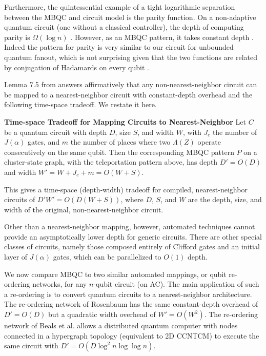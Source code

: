 Furthermore, the quintessential example of a tight logarithmic separation
between the MBQC and circuit model is the parity function.
On a non-adaptive quantum circuit (one without a classical controller),
the depth of computing parity is $\Omega(\log n)$ \cite{Fang2003}.
However, as an MBQC pattern, it takes constant depth \cite{Broadbent2007}.
Indeed the pattern for parity is very similar to our circuit for unbounded
quantum fanout, which is not surprising given that the two functions are
related by conjugation of Hadamards on every qubit \cite{Moore1999}.

Lemma 7.5 from \cite{Broadbent2007} answers affirmatively that any
non-nearest-neighbor circuit can be mapped to a nearest-neighbor
circuit with constant-depth overhead and the following time-space tradeoff.
We restate it here.

\begin{proposition}{\textbf{Time-space Tradeoff for Mapping Circuits to Nearest-Neighbor} \cite{Broadbent2007}}
Let $C$ be a quantum circuit with depth $D$, size $S$, and width $W$, with $J_c$ the number
of $J(\alpha)$ gates, and $m$ the number of places where two $\Lambda(Z)$ operate
consecutively on the same qubit. Then the corresponding MBQC pattern $P$
on a cluster-state graph, with the teleportation pattern above, has depth
$D' = O(D)$ and width $W' = W + J_c + m = O(W+S)$.
\label{prop:ts-mbqc}
\end{proposition}

This gives a time-space (depth-width) tradeoff for compiled,
nearest-neighbor circuits of $D'W' = O(D(W+S))$, where $D$, $S$, and $W$
are the depth, size, and width of the original, non-nearest-neighbor circuit.

Other than a nearest-neighbor mapping, however, automated techniques cannot
provide an asymptotically lower depth for generic circuits.
There are other special classes of circuits, namely those composed entirely of
Clifford gates and an initial layer of $J(\alpha)$ gates, which can be
parallelized to $O(1)$ depth.

We now compare MBQC to two similar automated mappings, or qubit re-ordering networks,
for any $n$-qubit circuit (on \textsf{AC}).
The main application of such a re-ordering is to convert quantum circuits
to a nearest-neighbor architecture. The re-ordering network of Rosenbaum
\cite{Rosenbaum2012} has the same constant-depth overhead of $D' = O(D)$
but a quadratic width overhead of $W' = O(W^2)$.
The re-ordering network of Beals et al. \cite{Beals2013} allows
a distributed quantum computer with nodes connected in a hypergraph
topology
(equivalent to \textsf{2D CCNTCM}) to execute the same circuit with
$D' = O(D\log^2n\log\log n)$.

